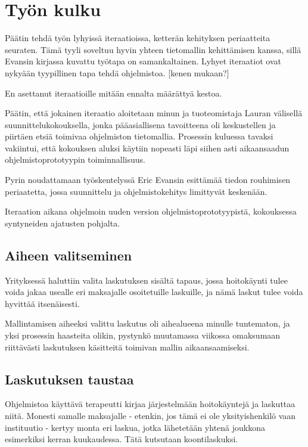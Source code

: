 \hypertarget{tyuxf6n-kulku}{%
\chapter{Työn kulku}\label{tyuxf6n-kulku}}

Päätin tehdä työn lyhyissä iteraatioissa, ketterän kehityksen
periaatteita seuraten. Tämä tyyli soveltuu hyvin yhteen tietomallin
kehittämisen kanssa, sillä Evansin kirjassa kuvattu työtapa on
samankaltainen. Lyhyet iteraatiot ovat nykyään tyypillinen tapa tehdä
ohjelmistoa. {[}kenen mukaan?{]}

En asettanut iteraatioille mitään ennalta määrättyä kestoa.

Päätin, että jokainen iteraatio aloitetaan minun ja tuoteomistaja Lauran
välisellä suunnittelukokouksella, jonka pääasiallisena tavoitteena oli
keskustellen ja piirtäen etsiä toimivaa ohjelmiston tietomallia.
Prosessin kuluessa tavaksi vakiintui, että kokouksen aluksi käytiin
nopeasti läpi siihen asti aikaansaadun ohjelmistoprototyypin
toiminnallisuus.

Pyrin noudattamaan työskentelyssä Eric Evansin esittämää tiedon
rouhimisen periaatetta, jossa suunnittelu ja ohjelmistokehitys
limittyvät keskenään.

Iteraation aikana ohjelmoin uuden version ohjelmistoprototyypistä,
kokouksessa syntyneiden ajatusten pohjalta.

\hypertarget{aiheen-valitseminen}{%
\section{Aiheen valitseminen}\label{aiheen-valitseminen}}

Yrityksessä haluttiin valita laskutuksen sisältä tapaus, jossa
hoitokäynti tulee voida jakaa usealle eri maksajalle osoitetuille
laskuille, ja nämä laskut tulee voida hyvittää itsenäisesti.

Mallintamisen aiheeksi valittu laskutus oli aihealueena minulle
tuntematon, ja yksi prosessin haasteita olikin, pystynkö muutamassa
viikossa omaksumaan riittävästi laskutuksen käsitteitä toimivan mallin
aikaansaamiseksi.

\hypertarget{laskutuksen-taustaa}{%
\section{Laskutuksen taustaa}\label{laskutuksen-taustaa}}

Ohjelmistoa käyttävä terapeutti kirjaa järjestelmään hoitokäyntejä ja
laskuttaa niitä. Monesti samalle maksajalle - etenkin, jos tämä ei ole
yksityishenkilö vaan instituutio - kertyy monta eri laskua, jotka
lähetetään yhtenä joukkona esimerkiksi kerran kuukaudessa. Tätä
kutsutaan koontilaskuksi.

